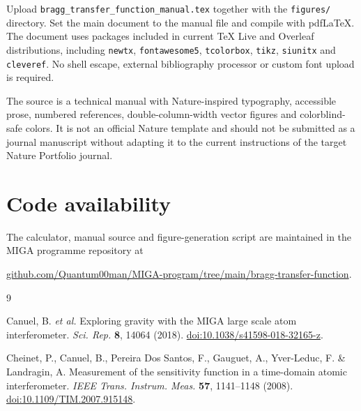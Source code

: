 \documentclass[11pt,a4paper]{article}
\begin{document}
Upload \texttt{bragg\_transfer\_function\_manual.tex} together with the \texttt{figures/} directory. Set the main document to the manual file and compile with pdfLaTeX. The document uses packages included in current TeX Live and Overleaf distributions, including \texttt{newtx}, \texttt{fontawesome5}, \texttt{tcolorbox}, \texttt{tikz}, \texttt{siunitx} and \texttt{cleveref}. No shell escape, external bibliography processor or custom font upload is required.

The source is a technical manual with Nature-inspired typography, accessible prose, numbered references, double-column-width vector figures and colorblind-safe colors. It is not an official Nature template and should not be submitted as a journal manuscript without adapting it to the current instructions of the target Nature Portfolio journal.

\section*{Code availability}

The calculator, manual source and figure-generation script are maintained in the MIGA programme repository at
\begin{center}
\href{https://github.com/Quantum00man/MIGA-program/tree/main/bragg\%20transfer\%20function}{github.com/Quantum00man/MIGA-program/tree/main/bragg-transfer-function}.
\end{center}

\begin{thebibliography}{9}

Canuel, B. \textit{et al.} Exploring gravity with the MIGA large scale atom interferometer. \textit{Sci. Rep.} \textbf{8}, 14064 (2018). \href{https://doi.org/10.1038/s41598-018-32165-z}{doi:10.1038/s41598-018-32165-z}.

Cheinet, P., Canuel, B., Pereira Dos Santos, F., Gauguet, A., Yver-Leduc, F. \& Landragin, A. Measurement of the sensitivity function in a time-domain atomic interferometer. \textit{IEEE Trans. Instrum. Meas.} \textbf{57}, 1141--1148 (2008). \href{https://doi.org/10.1109/TIM.2007.915148}{doi:10.1109/TIM.2007.915148}.

\end{thebibliography}
\end{document}
